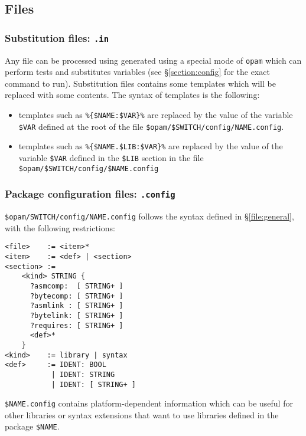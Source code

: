 \documentclass[a4paper,10pt]{article}
\begin{document}
\subsection{Files}

\subsubsection{Substitution files: {\tt *.in}}
\label{file:subst}

Any file can be processed using generated using a special mode of
{\tt opam} which can perform tests and substitutes variables (see
\S\ref{section:config} for the exact command to run). Substitution files
contains some templates which will be replaced with some contents. The
syntax of templates is the following:

\begin{itemize}

\item templates such as \verb+%{$NAME:$VAR}%+ are replaced by the value
  of the variable \verb+$VAR+ defined at the root of the file
  \verb+$opam/$SWITCH/config/NAME.config+.

\item templates such as \verb+%{$NAME.$LIB:$VAR}%+ are replaced by the
  value of the variable \verb+$VAR+ defined in the \verb+$LIB+ section
  in the file \verb+$opam/$SWITCH/config/$NAME.config+

\end{itemize}

\subsubsection{Package configuration files: {\tt *.config}}
\label{file:dotconfig}

\verb+$opam/SWITCH/config/NAME.config+ follows the syntax defined in
\S\ref{file:general}, with the following restrictions:

{\small
\begin{Verbatim}[frame=single]
<file>    := <item>*
<item>    := <def> | <section>
<section> :=
    <kind> STRING {
      ?asmcomp:  [ STRING+ ]
      ?bytecomp: [ STRING+ ]
      ?asmlink : [ STRING+ ]
      ?bytelink: [ STRING+ ]
      ?requires: [ STRING+ ]
      <def>*
    }
<kind>    := library | syntax
<def>     := IDENT: BOOL
           | IDENT: STRING
           | IDENT: [ STRING+ ]
\end{Verbatim}
}

\verb+$NAME.config+ contains platform-dependent information which can
be useful for other libraries or syntax extensions that want to use
libraries defined in the package \verb+$NAME+.
\end{document}
